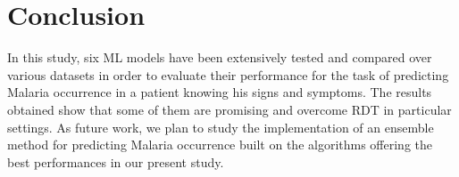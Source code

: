 \section{Conclusion}\label{conclusion}
In this study, six ML models have been extensively tested and compared over various datasets in order to evaluate their performance for the task of predicting Malaria occurrence in a patient knowing his signs and symptoms. The results obtained show that some of them are promising and overcome RDT in particular settings. As future work, we plan to study the implementation of an ensemble method for predicting Malaria occurrence built on the algorithms offering the best performances in our present study. 
